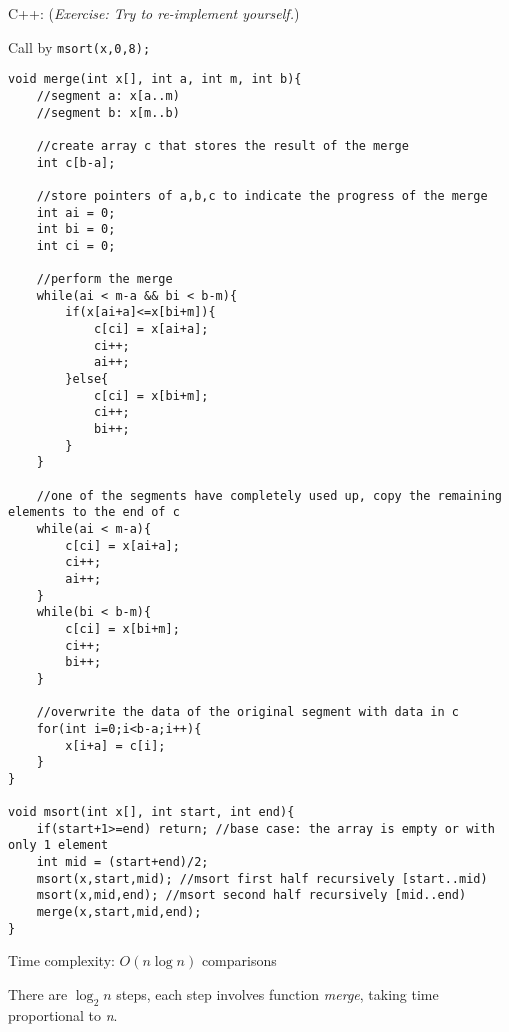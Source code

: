 \pagebreak


% 

C++: (\textit{Exercise: Try to re-implement yourself.})

Call by \texttt{msort(x,0,8);}

\begin{lstlisting}
void merge(int x[], int a, int m, int b){
    //segment a: x[a..m)
    //segment b: x[m..b)

    //create array c that stores the result of the merge 
    int c[b-a];

    //store pointers of a,b,c to indicate the progress of the merge
    int ai = 0;
    int bi = 0; 
    int ci = 0;
    
    //perform the merge
    while(ai < m-a && bi < b-m){
        if(x[ai+a]<=x[bi+m]){
            c[ci] = x[ai+a];
            ci++;
            ai++;
        }else{
            c[ci] = x[bi+m];
            ci++;
            bi++;
        }
    }

    //one of the segments have completely used up, copy the remaining elements to the end of c
    while(ai < m-a){
        c[ci] = x[ai+a];
        ci++;
        ai++;
    }
    while(bi < b-m){
        c[ci] = x[bi+m];
        ci++;
        bi++;
    }

    //overwrite the data of the original segment with data in c
    for(int i=0;i<b-a;i++){
        x[i+a] = c[i];
    }
}

void msort(int x[], int start, int end){
    if(start+1>=end) return; //base case: the array is empty or with only 1 element
    int mid = (start+end)/2;
    msort(x,start,mid); //msort first half recursively [start..mid)
    msort(x,mid,end); //msort second half recursively [mid..end)
    merge(x,start,mid,end);
}
\end{lstlisting}

Time complexity: $O(n\log n)$ comparisons


There are $\log_2 n$ steps, each step involves function \textit{merge}, taking time proportional to \textit{n}.

